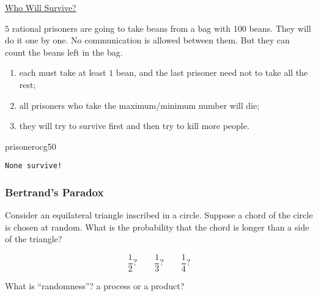 \documentclass[UTF8,11pt,colorlinks,compress,openany]{beamer}%
\begin{document}
\begin{frame}[fragile]{\href{https://www.zhihu.com/question/19912025/answer/99088775}{Who Will Survive?}}
	\begin{problem}
		$5$ rational prisoners are going to take beans from a bag with 100 beans. They will do it one by one. No communication is allowed between them. But they can count the beans left in the bag.
		\begin{enumerate}
			\item each must take at least $1$ bean, and the last prisoner need not to take all the rest;
			\item all prisoners who take the maximum/minimum number will die;
			\item they will try to survive first and then try to kill more people.
		\end{enumerate}
	\end{problem}
\begin{ocg}{prisoner}{ocg5}{0}
\begin{verbatim}
None survive!
\end{verbatim}
\end{ocg}
\end{frame}

\begin{frame}\frametitle{Bertrand's Paradox}
	\begin{problem}
		Consider an equilateral triangle inscribed in a circle. Suppose a chord of the circle is chosen at random. What is the probability that the chord is longer than a side of the triangle?
	\end{problem}
\begin{center}
\qquad
{}\qquad
{}
\[\frac{1}{2}?\qquad \frac{1}{3}?\qquad \frac{1}{4}?\]
\end{center}
	\begin{center}
		What is ``randomness''? a process or a product?
	\end{center}
\end{frame}
\end{document}
